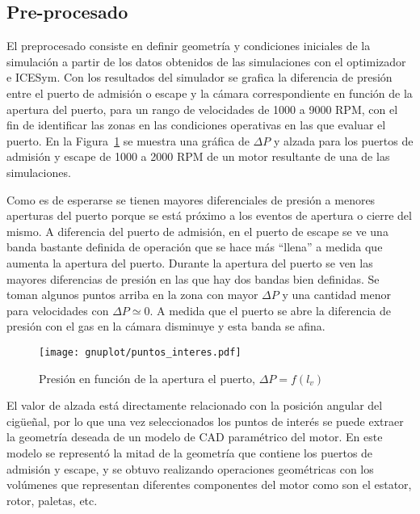 
\subsection{Pre-procesado}
%
El preprocesado consiste en definir geometría y condiciones iniciales de la
simulación a partir de los datos obtenidos de las simulaciones con el
optimizador e ICESym.
%
Con los resultados del simulador se grafica la diferencia de presión entre el
puerto de admisión o escape y la cámara correspondiente en función de la apertura
del puerto, para un rango de velocidades de 1000 a 9000 RPM, con el fin de
identificar las zonas en las condiciones operativas en las que evaluar el puerto.
%
En la Figura~\ref{fig:puntos_interes} se muestra una gráfica de $\Delta P$ y
alzada para los puertos de admisión y escape de 1000 a 2000 RPM de un motor
resultante de una de las simulaciones.

Como es de esperarse se tienen mayores diferenciales de presión a menores
aperturas del puerto porque se está próximo a los eventos de apertura o cierre
del mismo.
%
A diferencia del puerto de admisión, en el puerto de escape se ve una banda
bastante definida de operación que se hace más ``llena'' a medida que aumenta la
apertura del puerto.
%
Durante la apertura del puerto se ven las mayores diferencias de presión en las
que hay dos bandas bien definidas.
%
Se toman algunos puntos arriba en la zona con mayor $\Delta P$ y una cantidad
menor para velocidades con $\Delta P \simeq 0$.
%
A medida que el puerto se abre la diferencia de presión con el gas en la cámara
disminuye y esta banda se afina.

\begin{figure}
    \centering
    \texttt{[image: gnuplot/puntos\_interes.pdf]}
    \caption{Presión en función de la apertura el puerto,
$\Delta P = f(l_{v})$}\label{fig:puntos_interes}
\end{figure}

El valor de alzada está directamente relacionado con la posición angular del
cigüeñal, por lo que una vez seleccionados los puntos de interés se puede
extraer la geometría deseada de un modelo de CAD paramétrico del motor.
%
En este modelo se representó la mitad de la geometría que contiene los puertos
de admisión y escape, y se obtuvo realizando operaciones geométricas con los
volúmenes que representan diferentes componentes del motor como son el estator,
rotor, paletas, etc.
%

